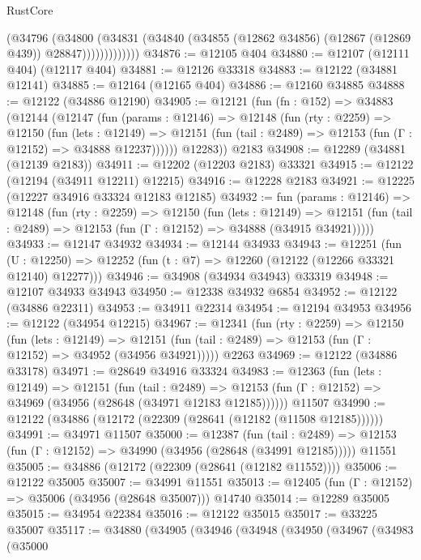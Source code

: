 \begin{lexlean}{RustCore}
\begin{coremodule}
                    (@34796
                      (@34800
                        (@34831
                          (@34840 (@34855 (@12862 @34856) (@12867 (@12869 @439)) @28847)))))))))))))
@34876 := @12105 @404
@34880 := @12107 (@12111 @404) (@12117 @404)
@34881 := @12126 @33318
@34883 := @12122 (@34881 @12141)
@34885 := @12164 (@12165 @404)
@34886 := @12160 @34885
@34888 := @12122 (@34886 @12190)
@34905 := @12121
    (fun (fn : @152) =>
    @34883
      (@12144
        (@12147
          (fun (params : @12146) =>
          @12148
            (fun (rty : @2259) =>
            @12150
              (fun (lets : @12149) =>
              @12151 (fun (tail : @2489) => @12153 (fun (Γ : @12152) => @34888 @12237))))))
        @12283))
    @2183
@34908 := @12289 (@34881 (@12139 @2183))
@34911 := @12202 (@12203 @2183) @33321
@34915 := @12122 (@12194 (@34911 @12211) @12215)
@34916 := @12228 @2183
@34921 := @12225 (@12227 @34916 @33324 @12183 @12185)
@34932 := fun (params : @12146) =>
  @12148
    (fun (rty : @2259) =>
    @12150
      (fun (lets : @12149) =>
      @12151 (fun (tail : @2489) => @12153 (fun (Γ : @12152) => @34888 (@34915 @34921)))))
@34933 := @12147 @34932
@34934 := @12144 @34933
@34943 := @12251
    (fun (U : @12250) => @12252 (fun (t : @7) => @12260 (@12122 (@12266 @33321 @12140) @12277)))
@34946 := @34908 (@34934 @34943) @33319
@34948 := @12107 @34933 @34943
@34950 := @12338 @34932 @6854
@34952 := @12122 (@34886 @22311)
@34953 := @34911 @22314
@34954 := @12194 @34953
@34956 := @12122 (@34954 @12215)
@34967 := @12341
    (fun (rty : @2259) =>
    @12150
      (fun (lets : @12149) =>
      @12151 (fun (tail : @2489) => @12153 (fun (Γ : @12152) => @34952 (@34956 @34921)))))
    @2263
@34969 := @12122 (@34886 @33178)
@34971 := @28649 @34916 @33324
@34983 := @12363
    (fun (lets : @12149) =>
    @12151
      (fun (tail : @2489) =>
      @12153 (fun (Γ : @12152) => @34969 (@34956 (@28648 (@34971 @12183 @12185))))))
    @11507
@34990 := @12122 (@34886 (@12172 (@22309 (@28641 (@12182 (@11508 @12185))))))
@34991 := @34971 @11507
@35000 := @12387
    (fun (tail : @2489) => @12153 (fun (Γ : @12152) => @34990 (@34956 (@28648 (@34991 @12185)))))
    @11551
@35005 := @34886 (@12172 (@22309 (@28641 (@12182 @11552))))
@35006 := @12122 @35005
@35007 := @34991 @11551
@35013 := @12405 (fun (Γ : @12152) => @35006 (@34956 (@28648 @35007))) @14740
@35014 := @12289 @35005
@35015 := @34954 @22384
@35016 := @12122 @35015
@35017 := @33225 @35007
@35117 := @34880
    (@34905
      (@34946
        (@34948
          (@34950
            (@34967
              (@34983
                (@35000

\end{coremodule}
\end{lexlean}
